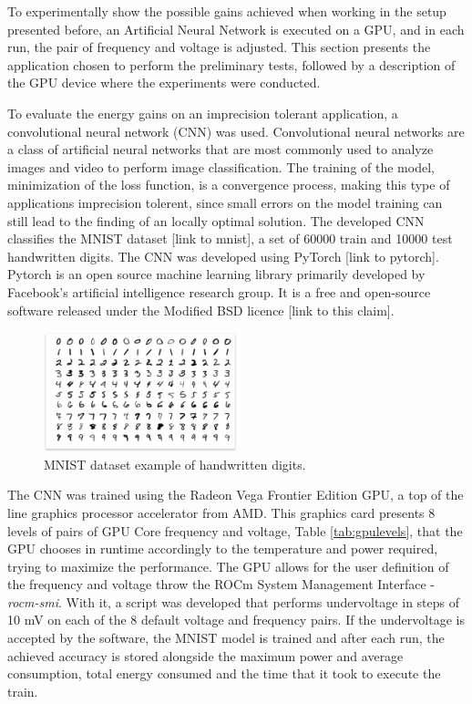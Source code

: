 To experimentally show the possible gains achieved when working in the setup presented before, an Artificial Neural Network is executed on a GPU, and in each run, the pair of frequency and voltage is adjusted. This section presents the application chosen to perform the preliminary tests, followed by a description of the GPU device where the experiments were conducted.

To evaluate the energy gains on an imprecision tolerant application, a convolutional neural network (CNN) was used. Convolutional neural networks are a class of artificial neural networks that are most commonly used to analyze images and video to perform image classification. The training of the model, minimization of the loss function, is a convergence process, making this type of applications imprecision tolerent, since small errors on the model training can still lead to the finding of an locally optimal solution.
The developed CNN classifies the MNIST dataset [link to mnist], a set of 60000 train and 10000 test handwritten digits. The CNN was developed using PyTorch [link to pytorch]. Pytorch is an open source machine learning library primarily developed by Facebook's artificial intelligence research group. It is a free and open-source  software released under the Modified BSD licence [link to this claim]. 

\begin{figure}[!htb]
  \centering
  \includegraphics[width=0.5\textwidth]{Figures/DL/mnist.png}
  \caption[]{MNIST dataset example of handwritten digits.}
  \label{fig:mnist}
\end{figure}

The CNN was trained using the Radeon Vega Frontier Edition GPU, a top of the line graphics processor accelerator from AMD. This graphics card presents 8 levels of pairs of GPU Core frequency and voltage, Table \ref{tab:gpulevels}, that the GPU chooses in runtime accordingly to the temperature and power required, trying to maximize the performance. The GPU allows for the user definition of the frequency and voltage throw the ROCm System Management Interface - \textit{rocm-smi}. With it, a script was developed that performs undervoltage in steps of 10 mV on each of the 8 default voltage and frequency pairs. If the undervoltage is accepted by the software, the MNIST model is trained and after each run, the achieved accuracy is stored alongside the maximum power and average consumption, total energy consumed and the time that it took to execute the train.





